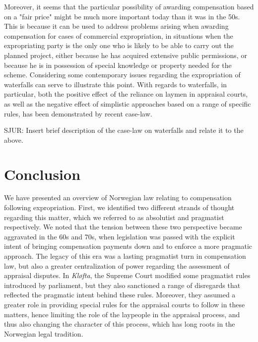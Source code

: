 \documentclass[10pt]{article} %
\newcommand{\sjur}[1]{SJUR: #1}
\begin{document}
Moreover, it seems that the particular possibility of awarding compensation based on a "fair price" might be much more important today than it was in the 50s. This is because it can be used to address problems arising when awarding compensation for cases of commercial expropriation, in situations when the expropriating party is the only one who is likely to be able to carry out the planned project, either because he has acquired extensive public permissions, or because he is in possession of special knowledge or property needed for the scheme. Considering some contemporary issues regarding the expropriation of waterfalls can serve to illustrate this point. With regards to waterfalls, in particular, both the positive effect of the reliance on laymen in appraisal courts, as well as the negative effect of simplistic approaches based on a range of specific rules, has been demonstrated by recent case-law.

\sjur{Insert brief description of the case-law on waterfalls and relate it to the above.}

\section{Conclusion}\label{sec:conc}

We have presented an overview of Norwegian law relating to compensation following expropriation. First, we identified two different strands of thought regarding this matter, which we referred to as absolutist and pragmatist respectively. We noted that the tension between these two perspective became aggravated in the 60s and 70s, when legislation was passed with the explicit intent of bringing compensation payments down and to enforce a more pragmatic approach. The legacy of this era was a lasting pragmatist turn in compensation law, but also a greater centralization of power regarding the assessment of appraisal disputes. In \emph{Kløfta}, the Supreme Court modified some pragmatist rules introduced by parliament, but they also sanctioned a range of disregards that reflected the pragmatic intent behind these rules. Moreover, they assumed a greater role in providing special rules for the appraisal courts to follow in these matters, hence limiting the role of the laypeople in the appraisal process, and thus also changing the character of this process, which has long roots in the Norwegian legal tradition.
\end{document}

